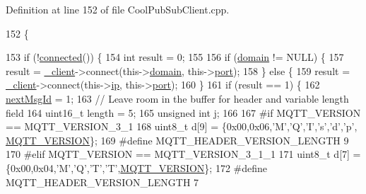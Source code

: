 Definition at line 152 of file Cool\+Pub\+Sub\+Client.\+cpp.


\begin{DoxyCode}
152                                                                                                            
                                                                                                                \{ 
       
153     \textcolor{keywordflow}{if} (!\hyperlink{class_cool_pub_sub_client_a3d5a5da4ddb1e5c1bea64d80c665d148}{connected}()) \{
154         \textcolor{keywordtype}{int} result = 0;
155 
156         \textcolor{keywordflow}{if} (\hyperlink{class_cool_pub_sub_client_a08d3a5619724f3408ad406ca4fb776e1}{domain} != NULL) \{
157             result = \hyperlink{class_cool_pub_sub_client_a487a65bafb6e3b8e9ab544b13a8878a0}{\_client}->connect(this->\hyperlink{class_cool_pub_sub_client_a08d3a5619724f3408ad406ca4fb776e1}{domain}, this->\hyperlink{class_cool_pub_sub_client_a01e3249102c057756af7a515c179844e}{port});
158         \} \textcolor{keywordflow}{else} \{
159             result = \hyperlink{class_cool_pub_sub_client_a487a65bafb6e3b8e9ab544b13a8878a0}{\_client}->connect(this->\hyperlink{class_cool_pub_sub_client_adabd958c6c3462433a3f3393f40a0966}{ip}, this->\hyperlink{class_cool_pub_sub_client_a01e3249102c057756af7a515c179844e}{port});
160         \}
161         \textcolor{keywordflow}{if} (result == 1) \{
162             \hyperlink{class_cool_pub_sub_client_af248fa4e54e878e2fece2891eb98d262}{nextMsgId} = 1;
163             \textcolor{comment}{// Leave room in the buffer for header and variable length field}
164             uint16\_t length = 5;
165             \textcolor{keywordtype}{unsigned} \textcolor{keywordtype}{int} j;
166 
167 \textcolor{preprocessor}{#if MQTT\_VERSION == MQTT\_VERSION\_3\_1}
168             uint8\_t d[9] = \{0x00,0x06,\textcolor{charliteral}{'M'},\textcolor{charliteral}{'Q'},\textcolor{charliteral}{'I'},\textcolor{charliteral}{'s'},\textcolor{charliteral}{'d'},\textcolor{charliteral}{'p'}, \hyperlink{_cool_pub_sub_client_8h_a702197a21870dfd505d92530b27754ac}{MQTT\_VERSION}\};
169 \textcolor{preprocessor}{#define MQTT\_HEADER\_VERSION\_LENGTH 9}
170 \textcolor{preprocessor}{#elif MQTT\_VERSION == MQTT\_VERSION\_3\_1\_1}
171             uint8\_t d[7] = \{0x00,0x04,\textcolor{charliteral}{'M'},\textcolor{charliteral}{'Q'},\textcolor{charliteral}{'T'},\textcolor{charliteral}{'T'},\hyperlink{_cool_pub_sub_client_8h_a702197a21870dfd505d92530b27754ac}{MQTT\_VERSION}\};
172 \textcolor{preprocessor}{#define MQTT\_HEADER\_VERSION\_LENGTH 7}

\end{DoxyCode}
